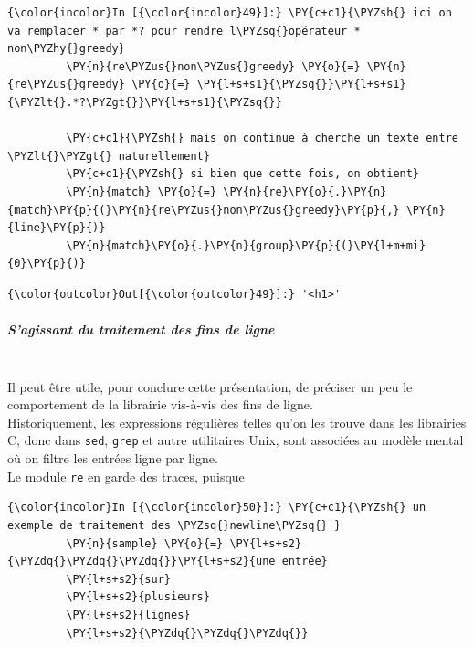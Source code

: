     \begin{Verbatim}[commandchars=\\\{\}]
{\color{incolor}In [{\color{incolor}49}]:} \PY{c+c1}{\PYZsh{} ici on va remplacer * par *? pour rendre l\PYZsq{}opérateur * non\PYZhy{}greedy}
         \PY{n}{re\PYZus{}non\PYZus{}greedy} \PY{o}{=} \PY{n}{re\PYZus{}greedy} \PY{o}{=} \PY{l+s+s1}{\PYZsq{}}\PY{l+s+s1}{\PYZlt{}.*?\PYZgt{}}\PY{l+s+s1}{\PYZsq{}}
         
         \PY{c+c1}{\PYZsh{} mais on continue à cherche un texte entre \PYZlt{}\PYZgt{} naturellement}
         \PY{c+c1}{\PYZsh{} si bien que cette fois, on obtient}
         \PY{n}{match} \PY{o}{=} \PY{n}{re}\PY{o}{.}\PY{n}{match}\PY{p}{(}\PY{n}{re\PYZus{}non\PYZus{}greedy}\PY{p}{,} \PY{n}{line}\PY{p}{)}
         \PY{n}{match}\PY{o}{.}\PY{n}{group}\PY{p}{(}\PY{l+m+mi}{0}\PY{p}{)}
\end{Verbatim}


\begin{Verbatim}[commandchars=\\\{\}]
{\color{outcolor}Out[{\color{outcolor}49}]:} '<h1>'
\end{Verbatim}
            
    \hypertarget{sagissant-du-traitement-des-fins-de-ligne}{%
\subparagraph{S'agissant du traitement des fins de
ligne\\\\}\label{sagissant-du-traitement-des-fins-de-ligne}}

    Il peut être utile, pour conclure cette présentation, de préciser un peu
le comportement de la librairie vis-à-vis des fins de ligne.\\

Historiquement, les expressions régulières telles qu'on les trouve dans
les librairies C, donc dans \texttt{sed}, \texttt{grep} et autre
utilitaires Unix, sont associées au modèle mental où on filtre les
entrées ligne par ligne.\\

Le module \texttt{re} en garde des traces, puisque

    \begin{Verbatim}[commandchars=\\\{\}]
{\color{incolor}In [{\color{incolor}50}]:} \PY{c+c1}{\PYZsh{} un exemple de traitement des \PYZsq{}newline\PYZsq{} }
         \PY{n}{sample} \PY{o}{=} \PY{l+s+s2}{\PYZdq{}\PYZdq{}\PYZdq{}}\PY{l+s+s2}{une entrée}
         \PY{l+s+s2}{sur}
         \PY{l+s+s2}{plusieurs}
         \PY{l+s+s2}{lignes}
         \PY{l+s+s2}{\PYZdq{}\PYZdq{}\PYZdq{}}
\end{Verbatim}


